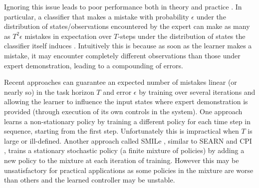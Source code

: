 \documentclass[twoside]{article}
\begin{document}
Ignoring this issue leads to poor performance both in theory and practice \citep{Ross10}. In particular, a classifier that makes a mistake with probability $\epsilon$ under the distribution of states/observations encountered by the expert can make as many as $T^2 \epsilon$ mistakes in expectation over $T$-steps under the distribution of states the classifier itself induces \citep{Ross10}. Intuitively this is because as soon as the learner makes a mistake, it may encounter completely different observations than those under expert demonstration, leading to a compounding of errors.


Recent approaches \citep{Ross10} can guarantee an expected number of mistakes linear (or nearly so) in the task horizon $T$ and error $\epsilon$ by training over several iterations and allowing the learner to influence the input states where expert demonstration is provided (through execution of its own controls in the system). One approach \citep{Ross10} learns a non-stationary policy by training a different policy for each time step in sequence, starting from the first step. Unfortunately this is impractical when $T$ is large or ill-defined. Another approach called SMILe \citep{Ross10}, similar to SEARN \citep{Daume09} and CPI \citep{Kakade02}, trains a stationary stochastic policy (a finite mixture of policies) by adding a new policy to the mixture at each iteration of training. However this may be unsatisfactory for practical applications as some policies in the mixture are worse than others and the learned controller may be unstable.
\end{document}
